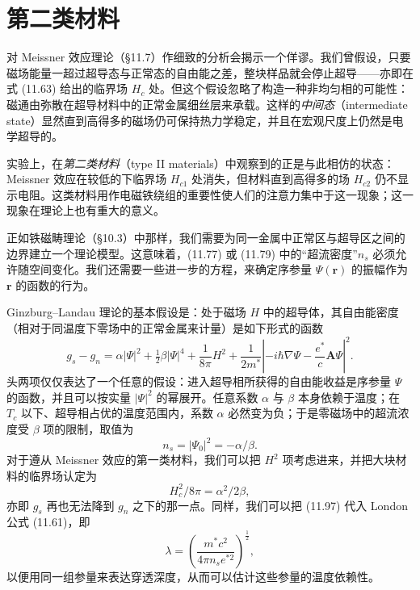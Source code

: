 \section{第二类材料}

对 Meissner 效应理论（§11.7）作细致的分析会揭示一个佯谬。我们曾假设，只要磁场能量一超过超导态与正常态的自由能之差，整块样品就会停止超导——亦即在式 (11.63) 给出的临界场 $H_c$ 处。但这个假设忽略了构造一种非均匀相的可能性：磁通由弥散在超导材料中的正常金属细丝层来承载。这样的\emph{中间态}（intermediate state）显然直到高得多的磁场仍可保持热力学稳定，并且在宏观尺度上仍然是电学超导的。

实验上，在\emph{第二类材料}（type II materials）中观察到的正是与此相仿的状态：Meissner 效应在较低的下临界场 $H_{c1}$ 处消失，但材料直到高得多的场 $H_{c2}$ 仍不显示电阻。这类材料用作电磁铁绕组的重要性使人们的注意力集中于这一现象；这一现象在理论上也有重大的意义。

正如铁磁畴理论（§10.3）中那样，我们需要为同一金属中正常区与超导区之间的边界建立一个理论模型。这意味着，(11.77) 或 (11.79) 中的“超流密度”$n_s$ 必须允许随空间变化。我们还需要一些进一步的方程，来确定序参量 $\Psi(\mathbf{r})$ 的振幅作为 $\mathbf{r}$ 的函数的行为。

Ginzburg--Landau 理论的基本假设是：处于磁场 $H$ 中的超导体，其自由能密度（相对于同温度下零场中的正常金属来计量）是如下形式的函数
\begin{equation*}
g_s - g_n = \alpha|\Psi|^{2} + \tfrac{1}{2}\beta|\Psi|^{4} + \frac{1}{8\pi}H^{2} + \frac{1}{2m^{*}}\left|-i\hbar\nabla\Psi - \frac{e^{*}}{c}\mathbf{A}\Psi\right|^{2}.
\tag{11.96}
\end{equation*}
头两项仅仅表达了一个任意的假设：进入超导相所获得的自由能收益是序参量 $\Psi$ 的函数，并且可以按实量 $|\Psi|^{2}$ 的幂展开。任意系数 $\alpha$ 与 $\beta$ 本身依赖于温度；在 $T_c$ 以下、超导相占优的温度范围内，系数 $\alpha$ 必然变为负；于是零磁场中的超流浓度受 $\beta$ 项的限制，取值为
\begin{equation*}
n_s = |\Psi_0|^{2} = -\alpha/\beta.
\tag{11.97}
\end{equation*}
对于遵从 Meissner 效应的第一类材料，我们可以把 $H^{2}$ 项考虑进来，并把大块材料的临界场认定为
\begin{equation*}
H_c^{2}/8\pi = \alpha^{2}/2\beta,
\tag{11.98}
\end{equation*}
亦即 $g_s$ 再也无法降到 $g_n$ 之下的那一点。同样，我们可以把 (11.97) 代入 London 公式 (11.61)，即
\begin{equation*}
\lambda = \left(\frac{m^{*}c^{2}}{4\pi n_s e^{*2}}\right)^{\frac{1}{2}},
\tag{11.99}
\end{equation*}
以便用同一组参量来表达穿透深度，从而可以估计这些参量的温度依赖性。

